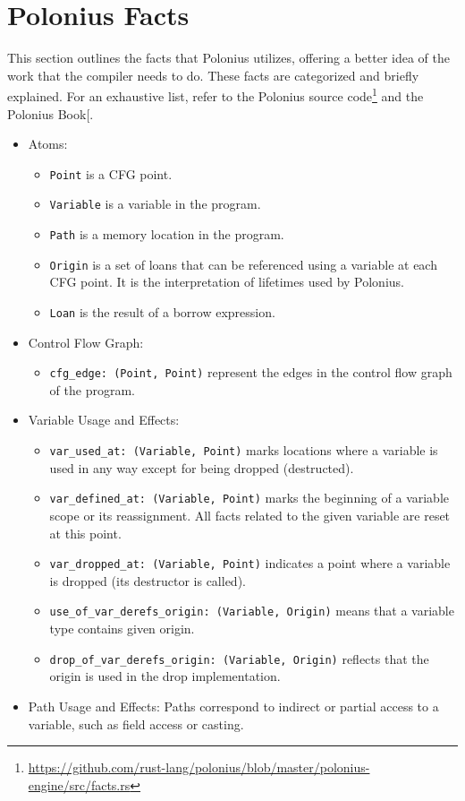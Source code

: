 \documentclass[
  11pt,
  twoside]{report}
\providecommand{\tightlist}{%
  \setlength{\itemsep}{0pt}\setlength{\parskip}{0pt}}
\DeclareRobustCommand{\href}[2]{#2\footnote{\url{#1}}}
\begin{document}
\section{Polonius Facts}\label{sec:polonius-facts}

This section outlines the facts that Polonius utilizes, offering a
better idea of the work that the compiler needs to do. These facts are
categorized and briefly explained. For an exhaustive list, refer to the
\href{https://github.com/rust-lang/polonius/blob/master/polonius-engine/src/facts.rs}{Polonius
source code} and the Polonius Book{[}\citeproc{ref-polonius}{10}{]}.

\begin{itemize}
\tightlist
\item
  Atoms:

  \begin{itemize}
  \tightlist
  \item
    \texttt{Point} is a CFG point.
  \item
    \texttt{Variable} is a variable in the program.
  \item
    \texttt{Path} is a memory location in the program.
  \item
    \texttt{Origin} is a set of loans that can be referenced using a
    variable at each CFG point. It is the interpretation of lifetimes
    used by Polonius.
  \item
    \texttt{Loan} is the result of a borrow expression.
  \end{itemize}
\item
  Control Flow Graph:

  \begin{itemize}
  \tightlist
  \item
    \texttt{cfg\_edge:\ (Point,\ Point)} represent the edges in the
    control flow graph of the program.
  \end{itemize}
\item
  Variable Usage and Effects:

  \begin{itemize}
  \tightlist
  \item
    \texttt{var\_used\_at:\ (Variable,\ Point)} marks locations where a
    variable is used in any way except for being dropped (destructed).
  \item
    \texttt{var\_defined\_at:\ (Variable,\ Point)} marks the beginning
    of a variable scope or its reassignment. All facts related to the
    given variable are reset at this point.
  \item
    \texttt{var\_dropped\_at:\ (Variable,\ Point)} indicates a point
    where a variable is dropped (its destructor is called).
  \item
    \texttt{use\_of\_var\_derefs\_origin:\ (Variable,\ Origin)} means
    that a variable type contains given origin.
  \item
    \texttt{drop\_of\_var\_derefs\_origin:\ (Variable,\ Origin)}
    reflects that the origin is used in the drop implementation.
  \end{itemize}
\item
  Path Usage and Effects: Paths correspond to indirect or partial access
  to a variable, such as field access or casting.


\end{itemize}
\end{document}
